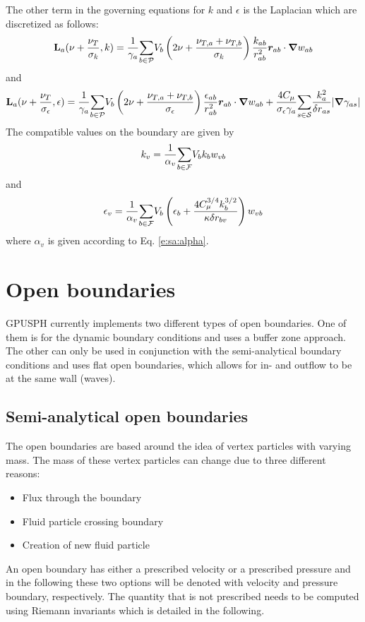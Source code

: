 The other term in the governing equations for $k$ and $\epsilon$ is the
Laplacian which are discretized as follows:
\begin{equation}
\textbf{L}_a(\nu + \frac{\nu_T}{\sigma_k}, k) = \frac{1}{\gamma_a}\underset{b \in \mathcal{P}}{\sum} V_b
\left( 2\nu + \frac{\nu_{T,a} + \nu_{T,b}}{\sigma_k} \right)
\frac{k_{ab}}{r_{ab}^2}\bm{r}_{ab}\cdot \bm{\nabla} w_{ab}
\label{e:turb:k-lap-sa}
\end{equation}
and
\begin{equation}
\textbf{L}_a(\nu + \frac{\nu_T}{\sigma_\epsilon}, \epsilon) = \frac{1}{\gamma_a}\underset{b \in \mathcal{P}}{\sum} V_b
\left( 2\nu + \frac{\nu_{T,a} + \nu_{T,b}}{\sigma_\epsilon} \right)
\frac{\epsilon_{ab}}{r_{ab}^2}\bm{r}_{ab}\cdot \bm{\nabla} w_{ab} +
\frac{4 C_\mu}{\sigma_\epsilon \gamma_a}\underset{s \in \mathcal{S}}{\sum}\frac{k_a^2}{\delta
r_{as}}|\bm{\nabla} \gamma_{as}|
\label{e:turb:eps-lap-sa}
\end{equation}
The compatible values on the boundary are given by
\begin{equation}
k_v = \frac{1}{\alpha_v}\underset{b \in \mathcal{F}}{\sum} V_b k_b w_{vb}
\label{e:turb:k-bound-sa}
\end{equation}
and
\begin{equation}
\epsilon_v = \frac{1}{\alpha_v}\underset{b \in \mathcal{F}}{\sum} V_b \left( \epsilon_b +
\frac{4 C_\mu^{3/4} k_b^{3/2}}{\kappa \delta r_{bv}} \right) w_{vb}
\label{e:turb:eps-bound-sa}
\end{equation}
where $\alpha_v$ is given according to Eq. \eqref{e:sa:alpha}.


\section{Open boundaries}
GPUSPH currently implements two different types of open boundaries. One
of them is for the dynamic boundary conditions and uses a buffer zone
approach. The other can only be used in conjunction with the
semi-analytical boundary conditions and uses flat open boundaries, which
allows for in- and outflow to be at the same wall (\eg waves).

\subsection{Semi-analytical open boundaries}

The open boundaries are based around the idea of vertex particles with
varying mass. The mass of these vertex particles can change due to three
different reasons:
\begin{itemize}
\item Flux through the boundary
\item Fluid particle crossing boundary
\item Creation of new fluid particle
\end{itemize}
An open boundary has either a prescribed velocity or a prescribed
pressure and in the following these two options will be denoted with
velocity and pressure boundary, respectively. The quantity that is not
prescribed needs to be computed using Riemann invariants which is
detailed in the following.

